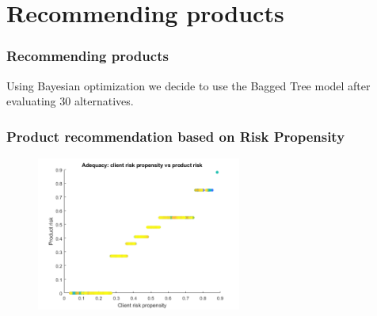 \documentclass{beamer}
\begin{document}
\section{Recommending products}

\begin{frame}
\frametitle{Recommending products}
Using Bayesian optimization we decide to use the Bagged Tree model after evaluating 30 alternatives.
\end{frame}

\begin{frame}
    \frametitle{Product recommendation based on Risk Propensity}
    \begin{figure}
    	\centering
    	\includegraphics[width=0.6\textwidth]{recomm1}
    \end{figure}
\end{frame}
\end{document}
